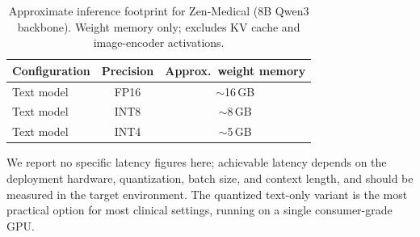 \documentclass[11pt,a4paper]{article}
\begin{document}
\begin{table}[h]
\centering
\caption{Approximate inference footprint for Zen-Medical (8B Qwen3 backbone). Weight memory only; excludes KV cache and image-encoder activations.}
\label{tab:compute}
\begin{tabular}{lcc}
\toprule
\textbf{Configuration} & \textbf{Precision} & \textbf{Approx.\ weight memory} \\
\midrule
Text model & FP16 & $\sim$16\,GB \\
Text model & INT8 & $\sim$8\,GB \\
Text model & INT4 & $\sim$5\,GB \\
\bottomrule
\end{tabular}
\end{table}

We report no specific latency figures here; achievable latency depends on the deployment hardware, quantization, batch size, and context length, and should be measured in the target environment. The quantized text-only variant is the most practical option for most clinical settings, running on a single consumer-grade GPU.
\end{document}
